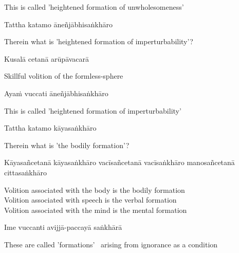 \begin{english}
  This is called 'heightened formation of unwholesomeness'
\end{english}

Tattha katamo āneñjābhisaṅkhāro

\begin{english}
  Therein what is 'heightened formation of imperturbability'?
\end{english}

Kusalā cetanā arūpāvacarā

\begin{english}
  Skillful volition of the formless-sphere
\end{english}

Ayaṁ vuccati āneñjābhisaṅkhāro

\begin{english}
  This is called 'heightened formation of imperturbability'
\end{english}

Tattha katamo kāyasaṅkhāro

\begin{english}
  Therein what is 'the bodily formation'?
\end{english}

Kāyasañcetanā kāyasaṅkhāro vacīsañcetanā vacīsaṅkhāro manosañcetanā cittasaṅkhāro

\begin{english}
  Volition associated with the body is the bodily formation\\
  Volition associated with speech is the verbal formation\\
  Volition associated with the mind is the mental
  formation
\end{english}

Ime vuccanti avijjā-paccayā saṅkhārā

\begin{english}
  These are called 'formations' \breathmark\ arising from ignorance as a condition
\end{english}

